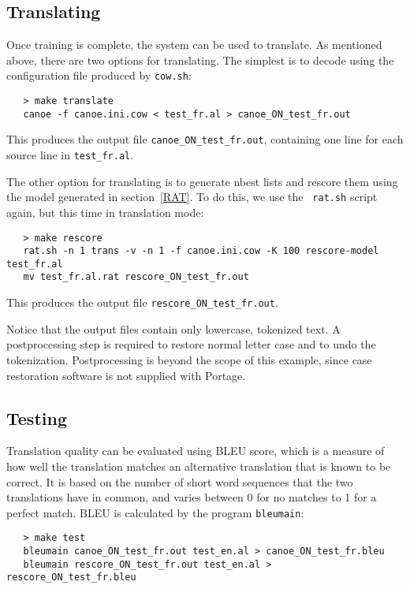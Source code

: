 \documentclass[11pt]{article}
\begin{document}
\subsection{Translating} \label{Translating}

Once training is complete, the system can be used to translate.  As mentioned
above, there are two options for translating. The simplest is to decode using
the configuration file produced by {\tt cow.sh}:
\begin{verbatim}
   > make translate
   canoe -f canoe.ini.cow < test_fr.al > canoe_ON_test_fr.out
\end{verbatim}
This produces the output file {\tt canoe\_ON\_test\_fr.out}, containing one
line for each source line in {\tt test\_fr.al}.

The other option for translating is to generate nbest lists and rescore them
using the model generated in section~\ref{RAT}. To do this, we use the {\tt
rat.sh} script again, but this time in translation mode:
\begin{verbatim}
   > make rescore
   rat.sh -n 1 trans -v -n 1 -f canoe.ini.cow -K 100 rescore-model test_fr.al
   mv test_fr.al.rat rescore_ON_test_fr.out
\end{verbatim}
This produces the output file {\tt rescore\_ON\_test\_fr.out}.

Notice that the output files contain only lowercase, tokenized text. A
postprocessing step is required to restore normal letter case and to undo the
tokenization. Postprocessing is beyond the scope of this example, since case
restoration software is not supplied with Portage.

\subsection{Testing} \label{Testing}

Translation quality can be evaluated using BLEU score, which is a measure of
how well the translation matches an alternative translation that is known to be
correct. It is based on the number of short word sequences that the two
translations have in common, and varies between 0 for no matches to 1 for a
perfect match. BLEU is calculated by the program {\tt bleumain}:
\begin{verbatim}
   > make test
   bleumain canoe_ON_test_fr.out test_en.al > canoe_ON_test_fr.bleu
   bleumain rescore_ON_test_fr.out test_en.al > rescore_ON_test_fr.bleu
\end{verbatim}
\end{document}
